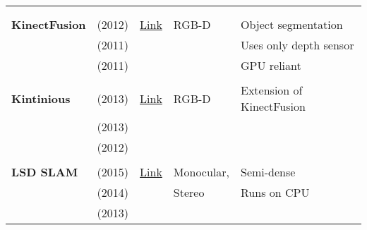 \documentclass[a4paper,12pt]{scrartcl}
\begin{document}
{\begin{longtable}{l|l|l|l|l}
                           &                                   &                                                                    &                       &\\
                           &                                   &                                                                    &                       &\\
    \textbf{KinectFusion}  & \cite{Pirovano2012} (2012)        & {\href{https://github.com/PointCloudLibrary/pcl}{Link}}            & RGB-D                 & Object segmentation\\
                           & \cite{Izadi2011} (2011)           &                                                                    &                       & Uses only depth sensor\\
                           & \cite{Newcombe2011a} (2011)       &                                                                    &                       & GPU reliant\\
                           &                                   &                                                                    &                       &\\
    \textbf{Kintinious}    & \cite{Whelan2013a} (2013)         & {\href{https://github.com/mp3guy/Kintinuous}{Link}}                & RGB-D                 & Extension of KinectFusion\\
                           & \cite{Whelan2013} (2013)          &                                                                    &                       &\\
                           & \cite{Whelan2012} (2012)          &                                                                    &                       &\\
                           &                                   &                                                                    &                       &\\
    \textbf{LSD SLAM}      & \cite{Engel2015} (2015)           & {\href{https://github.com/tum-vision/lsd_slam}{Link}}              & Monocular,            & Semi-dense\\
                           & \cite{Engel2014} (2014)           &                                                                    & Stereo                & Runs on CPU\\
                           & \cite{Engel2013} (2013)           &                                                                    &                       &\\

\end{longtable}}
\end{document}
